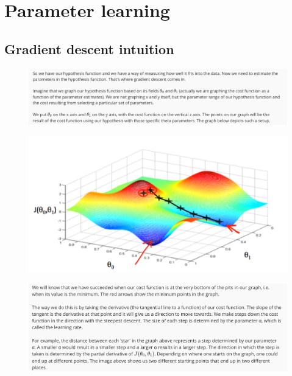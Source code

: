 \documentclass[12pt, A4,onecolumn]{article} %
\begin{document}
\section{Parameter learning}

\subsection{Gradient descent intuition}
\begin{figure}[H]
	\centering
	\includegraphics[width=1\textwidth]{./Imagenes/gradient1}
\end{figure}

\begin{figure}[H]
	\centering
	\includegraphics[width=1\textwidth]{./Imagenes/gradient2}
\end{figure}

\begin{figure}[H]
	\centering
	\includegraphics[width=1\textwidth]{./Imagenes/gradient3}
\end{figure}
\end{document}

